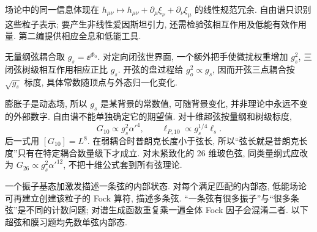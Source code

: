 场论中的同一信息体现在 $h_{\mu\nu}\mapsto h_{\mu\nu}+\partial_\mu\xi_\nu+\partial_\nu\xi_\mu$ 的线性规范冗余. 自由谱只识别这些粒子表示; 要产生非线性爱因斯坦引力, 还需检验弦相互作用及低能有效作用量. 第二编提供相应全息和低能工具.

无量纲弦耦合取 $g_s=\ee^{\Phi_0}$. 对定向闭弦世界面, 一个额外把手使微扰权重增加 $g_s^2$, 三闭弦树级相互作用相应正比 $g_s$. 开弦的盘过程给 $g_o^2\propto g_s$, 因而开弦三点耦合按 $\sqrt{g_s}$ 标度, 具体常数随顶点与外态归一化变化.

膨胀子是动态场, 所以 $g_s$ 是某背景的常数值, 可随背景变化, 并非理论中永远不变的外部数字. 自由谱不能单独确定它的期望值. 对十维超弦按量纲和树级标度,
\[
 G_{10}\propto g_s^2\alpha'^4,\qquad
 \ell_{P,10}\propto g_s^{1/4}\ell_s.
\]
后一式用 $[G_{10}]=L^8$. 在弱耦合时普朗克长度小于弦长, 所以“弦长就是普朗克长度”只有在特定耦合数量级下才成立. 对未紧致化的 26 维玻色弦, 同类量纲式应改为 $G_{26}\propto g_s^2\alpha'^{12}$, 不把十维公式套到所有弦理论.

一个振子基态加激发描述一条弦的内部状态. 对每个满足匹配的内部态, 低能场论可再建立创建该粒子的 Fock 算符, 描述多条弦. “一条弦有很多振子”与“很多条弦”是不同的计数问题; 对谱生成函数重复乘一遍全体 Fock 因子会混淆二者. 以下超弦和膜习题均先数单弦内部态.
